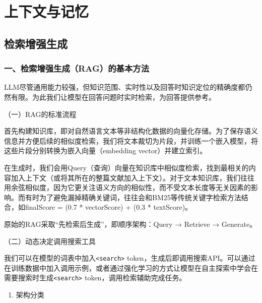 \hypertarget{ux4e0aux4e0bux6587ux4e0eux8bb0ux5fc6}{%
\chapter{上下文与记忆}\label{ux4e0aux4e0bux6587ux4e0eux8bb0ux5fc6}}

\hypertarget{ux68c0ux7d22ux589eux5f3aux751fux6210}{%
\section{检索增强生成}\label{ux68c0ux7d22ux589eux5f3aux751fux6210}}

\hypertarget{ux4e00ux68c0ux7d22ux589eux5f3aux751fux6210ragux7684ux57faux672cux65b9ux6cd5}{%
\subsection{一、检索增强生成（RAG）的基本方法}\label{ux4e00ux68c0ux7d22ux589eux5f3aux751fux6210ragux7684ux57faux672cux65b9ux6cd5}}

LLM尽管通用能力较强，但知识范围、实时性以及回答时知识定位的精确度都仍然有限。为此我们让模型在回答问题时实时检索，为回答提供参考。

（一）RAG的标准流程

首先构建知识库，即对自然语言文本等非结构化数据的向量化存储。为了保存语义信息并方便后续的相似度检索，我们将文本裁切为片段，并训练一个嵌入模型，将这些片段分别转换为嵌入向量（embedding vector）并建立索引。

在生成时，我们会用Query（查询）向量在知识库中相似度检索，找到最相关的内容加入上下文（或将其所在的整篇文献加入上下文）。对于文本知识库，我们往往用余弦相似度，因为它更关注语义方向的相似性，而不受文本长度等无关因素的影响。而有时为了避免漏掉精确关键词，往往会和BM25等传统关键字检索方法结合，如finalScore = (0.7 * vectorScore) + (0.3 * textScore)。

原始的RAG采取``先检索后生成''，即顺序架构：Query → Retrieve → Generate。

（二）动态决定调用搜索工具

我们可以在模型的词表中加入\texttt{\textless{}search\textgreater{}} token，生成后即调用搜索API。可以通过在训练数据中加入调用示例，或者通过强化学习的方式让模型在自主探索中学会在需要搜索时生成\texttt{\textless{}search\textgreater{}} token，调用检索辅助完成任务。

\begin{enumerate}
\def\labelenumi{\arabic{enumi}.}
\tightlist
\item
  架构分类
\end{enumerate}

